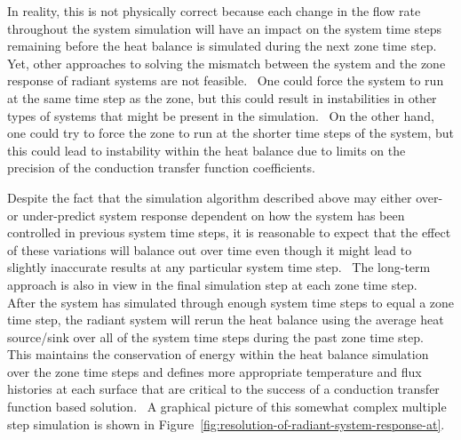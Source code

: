 In reality, this is not physically correct because each change in the flow rate throughout the system simulation will have an impact on the system time steps remaining before the heat balance is simulated during the next zone time step.~ Yet, other approaches to solving the mismatch between the system and the zone response of radiant systems are not feasible.~ One could force the system to run at the same time step as the zone, but this could result in instabilities in other types of systems that might be present in the simulation.~ On the other hand, one could try to force the zone to run at the shorter time steps of the system, but this could lead to instability within the heat balance due to limits on the precision of the conduction transfer function coefficients.

Despite the fact that the simulation algorithm described above may either over- or under-predict system response dependent on how the system has been controlled in previous system time steps, it is reasonable to expect that the effect of these variations will balance out over time even though it might lead to slightly inaccurate results at any particular system time step.~ The long-term approach is also in view in the final simulation step at each zone time step.~ After the system has simulated through enough system time steps to equal a zone time step, the radiant system will rerun the heat balance using the average heat source/sink over all of the system time steps during the past zone time step.~ This maintains the conservation of energy within the heat balance simulation over the zone time steps and defines more appropriate temperature and flux histories at each surface that are critical to the success of a conduction transfer function based solution.~ A graphical picture of this somewhat complex multiple step simulation is shown in Figure~\ref{fig:resolution-of-radiant-system-response-at}.

